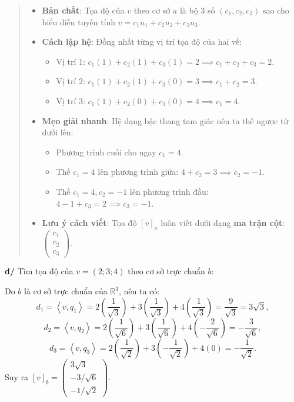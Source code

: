 \documentclass[12pt,a4paper]{article}
\newcommand{\R}{\mathbb{R}}
\newcommand{\ip}[2]{\left\langle #1,#2\right\rangle}
\begin{document}
\begin{quote}
\small
\noindent{}\par\vspace{3pt}
\begin{itemize}[noitemsep,topsep=2pt]
\item \textbf{Bản chất}: Tọa độ của $v$ theo cơ sở $a$ là bộ 3 số $(c_1, c_2, c_3)$ sao cho biểu diễn tuyến tính $v = c_1u_1 + c_2u_2 + c_3u_3$.
\item \textbf{Cách lập hệ}: Đồng nhất từng vị trí tọa độ của hai vế:
  \begin{itemize}[noitemsep]
  \item Vị trí 1: $c_1(1) + c_2(1) + c_3(1) = 2 \implies c_1 + c_2 + c_3 = 2$.
  \item Vị trí 2: $c_1(1) + c_2(1) + c_3(0) = 3 \implies c_1 + c_2 = 3$.
  \item Vị trí 3: $c_1(1) + c_2(0) + c_3(0) = 4 \implies c_1 = 4$.
  \end{itemize}
\item \textbf{Mẹo giải nhanh}: Hệ dạng bậc thang tam giác nên ta thế ngược từ dưới lên:
  \begin{itemize}[noitemsep]
  \item Phương trình cuối cho ngay $c_1 = 4$.
  \item Thế $c_1=4$ lên phương trình giữa: $4 + c_2 = 3 \implies c_2 = -1$.
  \item Thế $c_1=4, c_2=-1$ lên phương trình đầu: $4 - 1 + c_3 = 2 \implies c_3 = -1$.
  \end{itemize}
\item \textbf{Lưu ý cách viết}: Tọa độ $[v]_a$ luôn viết dưới dạng \textbf{ma trận cột}: $\begin{pmatrix} c_1 \\ c_2 \\ c_3 \end{pmatrix}$.
\end{itemize}
\end{quote}

\vspace{0.2cm}
\textbf{d/} Tìm tọa độ của $v=(2; 3; 4)$ theo cơ sở trực chuẩn $b$:

Do $b$ là cơ sở trực chuẩn của $\R^3$, nên ta có:
\[
d_1 = \ip{v}{q_1} = 2\left(\frac{1}{\sqrt{3}}\right) + 3\left(\frac{1}{\sqrt{3}}\right) + 4\left(\frac{1}{\sqrt{3}}\right) = \frac{9}{\sqrt{3}} = 3\sqrt{3},
\]
\[
d_2 = \ip{v}{q_2} = 2\left(\frac{1}{\sqrt{6}}\right) + 3\left(\frac{1}{\sqrt{6}}\right) + 4\left(-\frac{2}{\sqrt{6}}\right) = -\frac{3}{\sqrt{6}},
\]
\[
d_3 = \ip{v}{q_3} = 2\left(\frac{1}{\sqrt{2}}\right) + 3\left(-\frac{1}{\sqrt{2}}\right) + 4(0) = -\frac{1}{\sqrt{2}}.
\]
Suy ra $[v]_b = \begin{pmatrix} 3\sqrt{3} \\ -3/\sqrt{6} \\ -1/\sqrt{2} \end{pmatrix}$.
\end{document}
